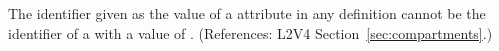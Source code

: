 The identifier given as the value of a 
attribute in any \InitialAssignment definition cannot be the
identifier of a \Compartment with a 
value of .
(References: L2V4 Section~\ref{sec:compartments}.)
